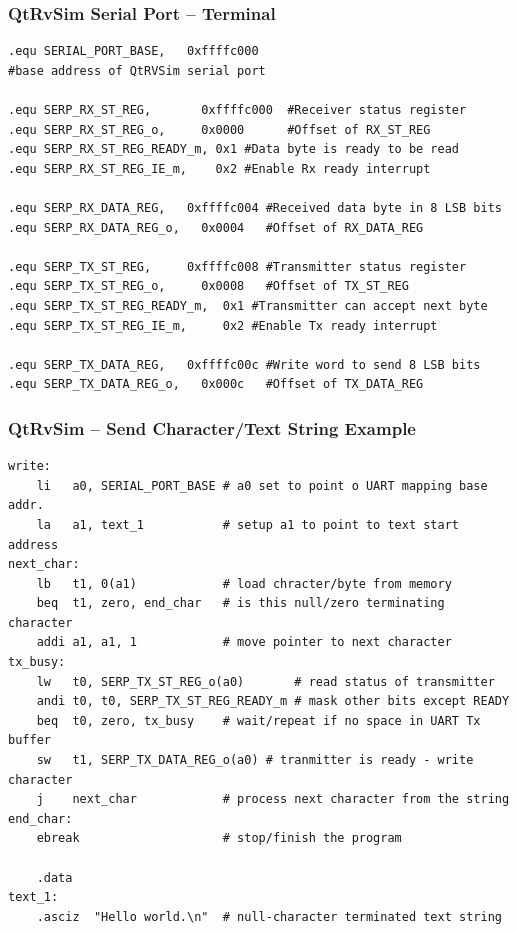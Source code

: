 \documentclass{beamer}
\begin{document}
\begin{frame}[fragile]
\frametitle{QtRvSim Serial Port -- Terminal}

\begin{verbatim}
.equ SERIAL_PORT_BASE,   0xffffc000
#base address of QtRVSim serial port

.equ SERP_RX_ST_REG,       0xffffc000  #Receiver status register
.equ SERP_RX_ST_REG_o,     0x0000      #Offset of RX_ST_REG
.equ SERP_RX_ST_REG_READY_m, 0x1 #Data byte is ready to be read
.equ SERP_RX_ST_REG_IE_m,    0x2 #Enable Rx ready interrupt

.equ SERP_RX_DATA_REG,   0xffffc004 #Received data byte in 8 LSB bits
.equ SERP_RX_DATA_REG_o,   0x0004   #Offset of RX_DATA_REG

.equ SERP_TX_ST_REG,     0xffffc008 #Transmitter status register
.equ SERP_TX_ST_REG_o,     0x0008   #Offset of TX_ST_REG
.equ SERP_TX_ST_REG_READY_m,  0x1 #Transmitter can accept next byte
.equ SERP_TX_ST_REG_IE_m,     0x2 #Enable Tx ready interrupt

.equ SERP_TX_DATA_REG,   0xffffc00c #Write word to send 8 LSB bits
.equ SERP_TX_DATA_REG_o,   0x000c   #Offset of TX_DATA_REG
\end{verbatim}
\end{frame}

\begin{frame}[fragile]
\frametitle{QtRvSim -- Send Character/Text String Example}

\begin{verbatim}
write:
    li   a0, SERIAL_PORT_BASE # a0 set to point o UART mapping base addr.
    la   a1, text_1           # setup a1 to point to text start address
next_char:
    lb   t1, 0(a1)            # load chracter/byte from memory
    beq  t1, zero, end_char   # is this null/zero terminating character
    addi a1, a1, 1            # move pointer to next character
tx_busy:
    lw   t0, SERP_TX_ST_REG_o(a0)       # read status of transmitter
    andi t0, t0, SERP_TX_ST_REG_READY_m # mask other bits except READY
    beq  t0, zero, tx_busy    # wait/repeat if no space in UART Tx buffer
    sw   t1, SERP_TX_DATA_REG_o(a0) # tranmitter is ready - write character
    j    next_char            # process next character from the string
end_char:
    ebreak                    # stop/finish the program

    .data
text_1:
    .asciz  "Hello world.\n"  # null-character terminated text string
\end{verbatim}

\end{frame}
\end{document}
